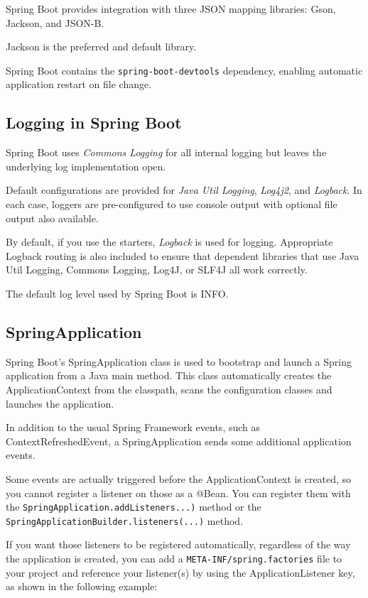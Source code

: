 \documentclass{scrartcl}
\begin{document}
Spring Boot provides integration with three JSON mapping libraries: Gson, Jackson, and JSON-B.

Jackson is the preferred and default library.

Spring Boot contains the \lstinline|spring-boot-devtools| dependency, enabling automatic application restart on file change.

\subsection{Logging in Spring Boot}

Spring Boot uses \textit{Commons Logging} for all internal logging but leaves the underlying log implementation open.

Default configurations are provided for \textit{Java Util Logging}, \textit{Log4j2}, and \textit{Logback}. In each case, loggers are pre-configured to use console output with optional file output also available.

By default, if you use the starters, \textit{Logback} is used for logging. Appropriate Logback routing is also included to ensure that dependent libraries that use Java Util Logging, Commons Logging, Log4J, or SLF4J all work correctly.

The default log level used by Spring Boot is INFO.

\subsection{SpringApplication}

Spring Boot's SpringApplication class is used to bootstrap and launch a Spring application from a Java main method. This class automatically creates the ApplicationContext from the classpath, scans the configuration classes and launches the application.

In addition to the usual Spring Framework events, such as ContextRefreshedEvent, a SpringApplication sends some additional application events.

Some events are actually triggered before the ApplicationContext is created, so you cannot register a listener on those as a @Bean. You can register them with the \lstinline|SpringApplication.addListeners...)| method or the \lstinline|SpringApplicationBuilder.listeners(...)| method.

If you want those listeners to be registered automatically, regardless of the way the application is created, you can add a \lstinline|META-INF/spring.factories| file to your project and reference your listener(s) by using the ApplicationListener key, as shown in the following example:
\end{document}
